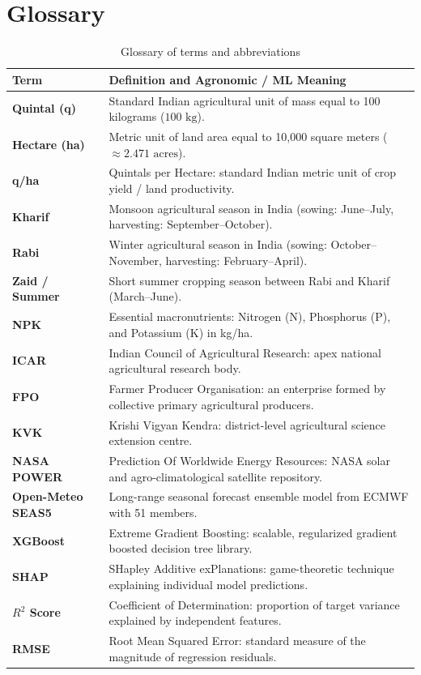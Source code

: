 \documentclass[11pt,a4paper]{report}
\begin{document}
\chapter{Glossary}
\begin{table}[htbp]
\centering
\small
\caption{Glossary of terms and abbreviations}
\begin{tabularx}{\textwidth}{lX}
\toprule
\textbf{Term} & \textbf{Definition and Agronomic / ML Meaning} \\
\midrule
\textbf{Quintal (q)} & Standard Indian agricultural unit of mass equal to 100 kilograms ($100\text{ kg}$). \\
\textbf{Hectare (ha)} & Metric unit of land area equal to 10,000 square meters ($\approx 2.471\text{ acres}$). \\
\textbf{q/ha} & Quintals per Hectare: standard Indian metric unit of crop yield / land productivity. \\
\textbf{Kharif} & Monsoon agricultural season in India (sowing: June--July, harvesting: September--October). \\
\textbf{Rabi} & Winter agricultural season in India (sowing: October--November, harvesting: February--April). \\
\textbf{Zaid / Summer} & Short summer cropping season between Rabi and Kharif (March--June). \\
\textbf{NPK} & Essential macronutrients: Nitrogen (N), Phosphorus (P), and Potassium (K) in kg/ha. \\
\textbf{ICAR} & Indian Council of Agricultural Research: apex national agricultural research body. \\
\textbf{FPO} & Farmer Producer Organisation: an enterprise formed by collective primary agricultural producers. \\
\textbf{KVK} & Krishi Vigyan Kendra: district-level agricultural science extension centre. \\
\textbf{NASA POWER} & Prediction Of Worldwide Energy Resources: NASA solar and agro-climatological satellite repository. \\
\textbf{Open-Meteo SEAS5} & Long-range seasonal forecast ensemble model from ECMWF with 51 members. \\
\textbf{XGBoost} & Extreme Gradient Boosting: scalable, regularized gradient boosted decision tree library. \\
\textbf{SHAP} & SHapley Additive exPlanations: game-theoretic technique explaining individual model predictions. \\
\textbf{$R^2$ Score} & Coefficient of Determination: proportion of target variance explained by independent features. \\
\textbf{RMSE} & Root Mean Squared Error: standard measure of the magnitude of regression residuals. \\
\bottomrule
\end{tabularx}
\end{table}
\end{document}
